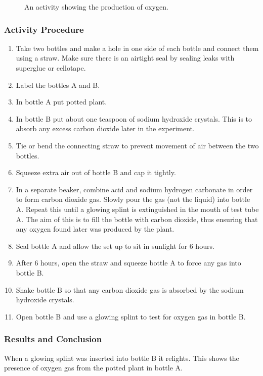 \begin{figure}[h]
\begin{center}
\def\svgwidth{6cm}

\caption{An activity showing the production of oxygen.}
\label{fig:oxygen}
\end{center}
\end{figure}

\subsubsection*{Activity Procedure}
\begin{enumerate}
\item{Take two bottles and make a hole in one side of each bottle and connect them using a straw. Make sure there is an airtight seal by sealing leaks with superglue or cellotape.}
\item{Label the bottles A and B.}
\item{In bottle A put potted plant.}
\item{In bottle B put about one teaspoon of sodium hydroxide crystals. This is to absorb any excess carbon dioxide later in the experiment.}
\item{Tie or bend the connecting straw to prevent movement of air between the two bottles.}
\item{Squeeze extra air out of bottle B and cap it tightly.}
\item{In a separate beaker, combine acid and sodium hydrogen carbonate in order to form carbon dioxide gas. Slowly pour the gas (not the liquid) into bottle A. Repeat this until a glowing splint is extinguished in the mouth of test tube A. The aim of this is to fill the bottle with carbon dioxide, thus ensuring that any oxygen found later was produced by the plant.}
\item{Seal bottle A and allow the set up to sit in sunlight for 6 hours.}
\item{After 6 hours, open the straw and squeeze bottle A to force any gas into bottle B.}
\item{Shake bottle B so that any carbon dioxide gas is absorbed by the sodium hydroxide crystals.}
\item{Open bottle B and use a glowing splint to test for oxygen gas in bottle B.}
\end{enumerate}

\subsubsection*{Results and Conclusion}
When a glowing splint was inserted into bottle B it relights. This shows the presence of oxygen gas from the potted plant in bottle A.

